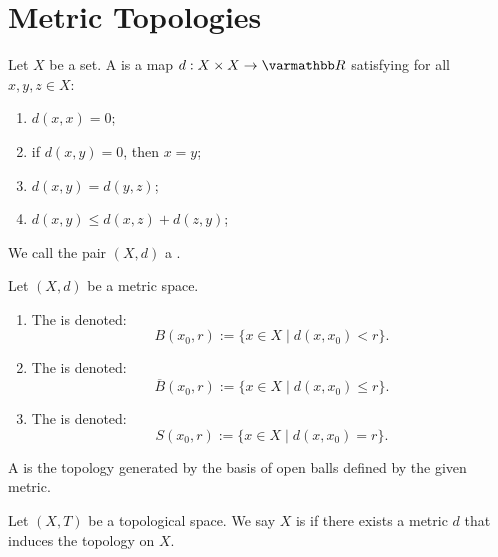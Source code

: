 \section{Metric Topologies}

\begin{definition}
    Let $X$ be a set. A  is a map $d:X \times X \rightarrow \bfR$ satisfying for all $x,y,z \in X$:
        \begin{enumerate}[label = (\arabic*),itemsep=1pt,topsep=3pt]
            \item $d(x,x) = 0$;
            \item if $d(x,y) = 0$, then $x=y$;
            \item $d(x,y) = d(y,z)$;
            \item $d(x,y) \leq d(x,z) + d(z,y)$;
        \end{enumerate}
    We call the pair $(X,d)$ a .
\end{definition}

\begin{definition}
    Let $(X,d)$ be a metric space.
    \begin{enumerate}[label = (\arabic*),itemsep=1pt,topsep=3pt]
        \item The  is denoted: \nl $$B(x_0,r) := \{x \in X \mid d(x,x_0) < r\}.$$
        \item The  is denoted: \nl $$\overline{B}(x_0,r) := \{x \in X \mid d(x,x_0) \leq r\}.$$
        \item The  is denoted: \nl $$S(x_0,r) := \{x \in X \mid d(x,x_0) = r\}.$$
    \end{enumerate}
\end{definition}

\begin{definition}
    A  is the topology generated by the basis of open balls defined by the given metric.
\end{definition}

\begin{definition}
    Let $(X,T)$ be a topological space. We say $X$ is  if there exists a metric $d$ that induces the topology on $X$.
\end{definition}

